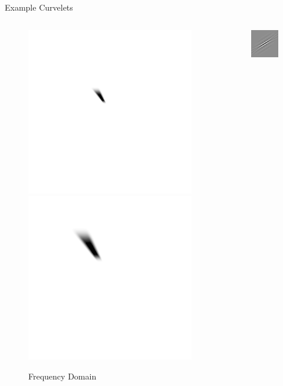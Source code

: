\documentclass[mathserif]{beamer}
\begin{document}
\begin{frame}{Example Curvelets}
    \begin{columns}
        \begin{column}{.5\textwidth}
            \begin{figure}
                \includegraphics[width=.5\textwidth]{illustrations/curvelet_examples/curvelet_1_frequency}\\
                \includegraphics[width=.5\textwidth]{illustrations/curvelet_examples/curvelet_2_frequency}
                \caption{Frequency Domain}
            \end{figure}
        \end{column}
        \begin{column}{.5\textwidth}
            \begin{figure}
                \includegraphics[width=.5\textwidth]{illustrations/curvelet_examples/curvelet_1_time}\\

\end{figure}
\end{column}
\end{columns}
\end{frame}
\end{document}
